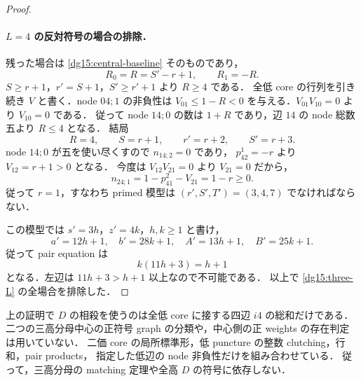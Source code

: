 \begin{proof}
\paragraph{$L=4$ の反対符号の場合の排除．}
残った場合は \eqref{dg15:central-baseline} そのものであり，
\[
 R_0=R=S'-r+1,\qquad R_1=-R.
\]
$S\geq r+1$，$r'=S+1$，$S'\geq r'+1$ より $R\geq4$ である．
全低 core の行列を引き続き $V$ と書く．node $04;1$ の非負性は
$V_{01}\leq1-R<0$ を与える．$V_{01}V_{10}=0$ より $V_{10}=0$ である．
従って node $14;0$ の数は $1+R$ であり，辺 $14$ の node 総数五より $R\leq4$ となる．
結局
\[
 R=4,\qquad S=r+1,\qquad r'=r+2,\qquad S'=r+3.
\]
node $14;0$ が五を使い尽くすので $n_{14;2}=0$ であり，
$p^1_{42}=-r$ より $V_{12}=r+1>0$ となる．
今度は $V_{12}V_{21}=0$ より $V_{21}=0$ だから，
\[
 n_{24;1}=1-p^2_{41}-V_{21}=1-r\geq0.
\]
従って $r=1$，すなわち primed 模型は $(r',S',T')=(3,4,7)$ でなければならない．

この模型では $s'=3h$，$z'=4k$，$h,k\geq1$ と書け，
\[
 a'=12h+1,\quad b'=28k+1,\quad A'=13h+1,\quad B'=25k+1.
\]
従って pair equation は
\[
 k(11h+3)=h+1
\]
となる．左辺は $11h+3>h+1$ 以上なので不可能である．
以上で \eqref{dg15:three-L} の全場合を排除した．
\end{proof}

\begin{remark}[使用した大域条件の範囲]
\label{dg15:scope}
上の証明で $D$ の相殺を使うのは全低 core に接する四辺 $i4$ の総和だけである．
二つの三高分母中心の正符号 graph の分類や，中心側の正 weights の存在判定は用いていない．
二価 core の局所標準形，低 puncture の整数 clutching，行和，pair products，
指定した低辺の node 非負性だけを組み合わせている．
従って，三高分母の matching 定理や全高 $D$ の符号に依存しない．
\end{remark}
